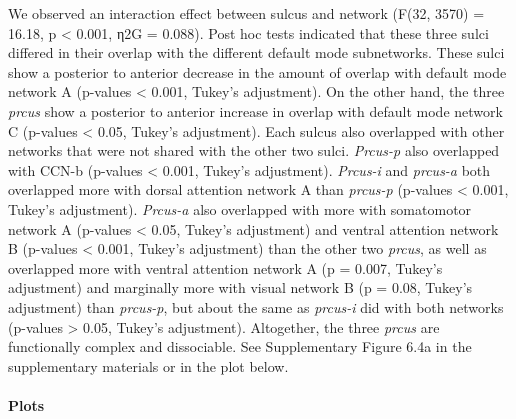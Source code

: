 \documentclass[
]{article}
\begin{document}
We observed an interaction effect between sulcus and network (F(32,
3570) = 16.18, p \textless{} 0.001, η2G = 0.088). Post hoc tests
indicated that these three sulci differed in their overlap with the
different default mode subnetworks. These sulci show a posterior to
anterior decrease in the amount of overlap with default mode network A
(p-values \textless{} 0.001, Tukey's adjustment). On the other hand, the
three \emph{prcus} show a posterior to anterior increase in overlap with
default mode network C (p-values \textless{} 0.05, Tukey's adjustment).
Each sulcus also overlapped with other networks that were not shared
with the other two sulci. \emph{Prcus-p} also overlapped with CCN-b
(p-values \textless{} 0.001, Tukey's adjustment). \emph{Prcus-i} and
\emph{prcus-a} both overlapped more with dorsal attention network A than
\emph{prcus-p} (p-values \textless{} 0.001, Tukey's adjustment).
\emph{Prcus-a} also overlapped with more with somatomotor network A
(p-values \textless{} 0.05, Tukey's adjustment) and ventral attention
network B (p-values \textless{} 0.001, Tukey's adjustment) than the
other two \emph{prcus}, as well as overlapped more with ventral
attention network A (p = 0.007, Tukey's adjustment) and marginally more
with visual network B (p = 0.08, Tukey's adjustment) than
\emph{prcus-p}, but about the same as \emph{prcus-i} did with both
networks (p-values \textgreater{} 0.05, Tukey's adjustment). Altogether,
the three \emph{prcus} are functionally complex and dissociable. See
Supplementary Figure 6.4a in the supplementary materials or in the plot
below.

\hypertarget{plots-1}{%
\paragraph{Plots}\label{plots-1}}
\end{document}
